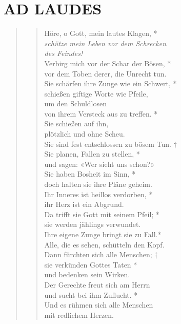 
\section[MITTWOCH]{AD LAUDES}

\def\greinitialformat#1{{\fontsize{40}{40}\selectfont #1}}
\gresetfirstlineaboveinitial{\small \textcolor{red}{ Ps 64}}{}
\setaboveinitialseparation{0.72mm}


\vspace{0.6cm}


\begin{quote}
\begin{verse}
Höre, o Gott, mein lautes Klagen, *\\
\textit{schütze mein Leben vor dem Schrecken\\
des Feindes!}\\ 
\vin Verbirg mich vor der Schar der Bösen, *\\ 
\vin vor dem Toben derer, die Unrecht tun.\\
Sie schärfen ihre Zunge wie ein Schwert, *\\
schießen giftige Worte wie Pfeile, \\ 
\vin um den Schuldlosen\\ 
\vin von ihrem Versteck aus zu treffen. *\\ 
\vin Sie schießen auf ihn,\\ 
\vin plötzlich und ohne Scheu.\\ 
Sie sind fest entschlossen zu bösem Tun. †\\
Sie planen, Fallen zu stellen, *\\ 
und sagen: «Wer sieht uns schon?»\\ 
\vin Sie haben Bosheit im Sinn, *\\ 
\vin doch halten sie ihre Pläne geheim.\\ 
Ihr Inneres ist heillos verdorben, *\\ 
ihr Herz ist ein Abgrund.\\ 
\vin Da trifft sie Gott mit seinem Pfeil; *\\ 
\vin sie werden jählings verwundet.\\
Ihre eigene Zunge bringt sie zu Fall.*\\
Alle, die es sehen, schütteln den Kopf.\\ 
\vin Dann fürchten sich alle Menschen; †\\ 
\vin sie verkünden Gottes Taten *\\ 
\vin und bedenken sein Wirken.\\
Der Gerechte freut sich am Herrn\\
und sucht bei ihm Zuflucht. *\\
Und es rühmen sich alle Menschen\\
mit redlichem Herzen.\\
\end{verse}
\end{quote}


